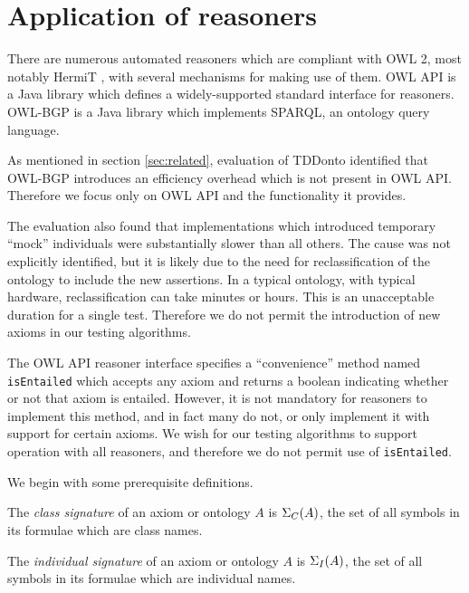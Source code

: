 \documentclass[paper.tex]{subfiles}
\begin{document}
\section{Application of reasoners}
\label{sec:reasoners}

There are numerous automated reasoners which are compliant with OWL 2, most notably HermiT \cite{Glimm:HermiT}, with several mechanisms for making use of them.  OWL API \cite{OWLAPI} is a Java library which defines a widely-supported standard interface for reasoners.  OWL-BGP \cite{OWLBGP} is a Java library which implements SPARQL, an ontology query language.

As mentioned in section \ref{sec:related}, evaluation of TDDonto identified that OWL-BGP introduces an efficiency overhead which is not present in OWL API.  Therefore we focus only on OWL API and the functionality it provides.

The evaluation also found that implementations which introduced temporary ``mock'' individuals were substantially slower than all others.  The cause was not explicitly identified, but it is likely due to the need for reclassification of the ontology to include the new assertions.  In a typical ontology, with typical hardware, reclassification can take minutes or hours.  This is an unacceptable duration for a single test.  Therefore we do not permit the introduction of new axioms in our testing algorithms.

The OWL API reasoner interface specifies a ``convenience'' method named \texttt{isEntailed} which accepts any axiom and returns a boolean indicating whether or not that axiom is entailed.  However, it is not mandatory for reasoners to implement this method, and in fact many do not, or only implement it with support for certain axioms.  We wish for our testing algorithms to support operation with all reasoners, and therefore we do not permit use of \texttt{isEntailed}.

We begin with some prerequisite definitions.

\begin{definition}
  The \emph{class signature} of an axiom or ontology $A$ is $\Sigma_C(A)$, the set of all symbols in its formulae which are class names.
\end{definition}

\begin{definition}
  The \emph{individual signature} of an axiom or ontology $A$ is $\Sigma_I(A)$, the set of all symbols in its formulae which are individual names.
\end{definition}
\end{document}
